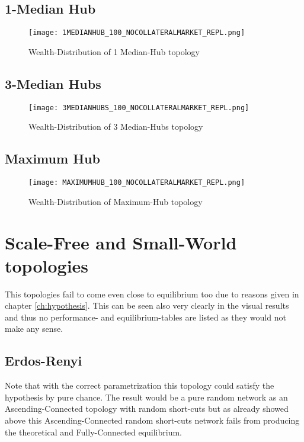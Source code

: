 \documentclass[Bachelorarbeit.tex]{subfiles}
\begin{document}
\subsection{1-Median Hub}
\begin{figure}[H]
	\centering
  \texttt{[image: 1MEDIANHUB\_100\_NOCOLLATERALMARKET\_REPL.png]}
	\caption{Wealth-Distribution of 1 Median-Hub topology}
	\label{fig:wealth_1MEDIANHUB_100_NOCOLLATERALMARKET_REPL}
\end{figure}

\subsection{3-Median Hubs}
\begin{figure}[H]
	\centering
  \texttt{[image: 3MEDIANHUBS\_100\_NOCOLLATERALMARKET\_REPL.png]}
	\caption{Wealth-Distribution of 3 Median-Hubs topology}
	\label{fig:wealth_3MEDIANHUBS_100_NOCOLLATERALMARKET_REPL}
\end{figure}

\subsection{Maximum Hub}
\begin{figure}[H]
	\centering
  \texttt{[image: MAXIMUMHUB\_100\_NOCOLLATERALMARKET\_REPL.png]}
	\caption{Wealth-Distribution of Maximum-Hub topology}
	\label{fig:wealth_MAXIMUMHUB_100_NOCOLLATERALMARKET_REPL}
\end{figure}

\section{Scale-Free and Small-World topologies}
This topologies fail to come even close to equilibrium too due to reasons given in chapter \ref{ch:hypothesis}. This can be seen also very clearly in the visual results and thus no performance- and equilibrium-tables are listed as they would not make any sense.

\subsection{Erdos-Renyi}
Note that with the correct parametrization this topology could satisfy the hypothesis by pure chance. The result would be a pure random network as an Ascending-Connected topology with random short-cuts but as already showed above this Ascending-Connected random short-cuts network fails from producing the theoretical and Fully-Connected equilibrium.
\end{document}
